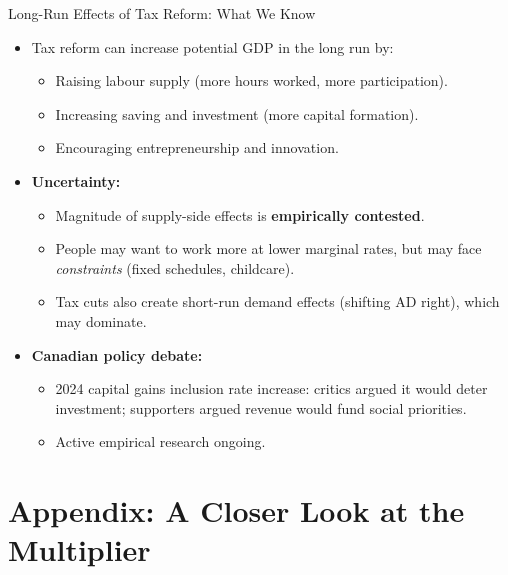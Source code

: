 \documentclass[aspectratio=169]{beamer}
\begin{document}
\begin{frame}{Long-Run Effects of Tax Reform: What We Know}
\transfade
\begin{itemize}
  \item Tax reform can increase potential GDP in the long run by:
  \begin{itemize}
    \item Raising labour supply (more hours worked, more participation).
    \item Increasing saving and investment (more capital formation).
    \item Encouraging entrepreneurship and innovation.
  \end{itemize}
  \item \textbf{Uncertainty:}
  \begin{itemize}
    \item Magnitude of supply-side effects is \textbf{empirically contested}.
    \item People may want to work more at lower marginal rates, but may face \textit{constraints} (fixed schedules, childcare).
    \item Tax cuts also create short-run demand effects (shifting AD right), which may dominate.
  \end{itemize}
  \item \textbf{Canadian policy debate:}
  \begin{itemize}
    \item 2024 capital gains inclusion rate increase: critics argued it would deter investment; supporters argued revenue would fund social priorities.
    \item Active empirical research ongoing.
  \end{itemize}
\end{itemize}
\end{frame}

\section*{Appendix: A Closer Look at the Multiplier}
\end{document}

